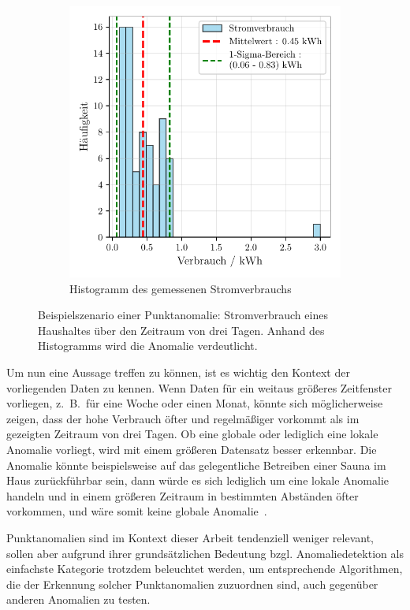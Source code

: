 \begin{figure}[!t]
\begin{subfigure}[b]{0.49\linewidth}
        \includegraphics[width=\linewidth]{ch4_anomalien/abbildungen/punktanomalie_hist.pdf}
        \caption{\centering Histogramm des gemessenen Stromverbrauchs}\label{subfig:smartmeter_histogramm}
    \end{subfigure}
    \caption{\centering Beispielszenario einer Punktanomalie: Stromverbrauch eines Haushaltes über den Zeitraum von
    drei Tagen. Anhand des Histogramms wird die Anomalie verdeutlicht.}\label{fig:punktanomalie}
\end{figure}

Um nun eine Aussage treffen zu können, ist es wichtig den Kontext der vorliegenden Daten zu kennen. Wenn Daten für ein weitaus größeres
Zeitfenster vorliegen, z.~B.~für eine Woche oder einen Monat, könnte sich möglicherweise zeigen, dass der hohe Verbrauch öfter und
regelmäßiger vorkommt als im gezeigten Zeitraum von drei Tagen. Ob eine globale oder lediglich eine lokale Anomalie vorliegt, wird
mit einem größeren Datensatz besser erkennbar. Die Anomalie könnte beispielsweise auf das gelegentliche Betreiben einer Sauna im Haus
zurückführbar sein, dann würde es sich lediglich um eine lokale Anomalie handeln und in einem größeren Zeitraum in bestimmten Abständen
öfter vorkommen, und wäre somit keine globale Anomalie~\Cite[Kap.~10]{Tan2014}.

Punktanomalien sind im Kontext dieser Arbeit tendenziell weniger relevant, sollen aber aufgrund ihrer grundsätzlichen Bedeutung bzgl.
Anomaliedetektion als einfachste Kategorie trotzdem beleuchtet werden, um entsprechende Algorithmen, die der Erkennung solcher
Punktanomalien zuzuordnen sind, auch gegenüber anderen Anomalien zu testen.

